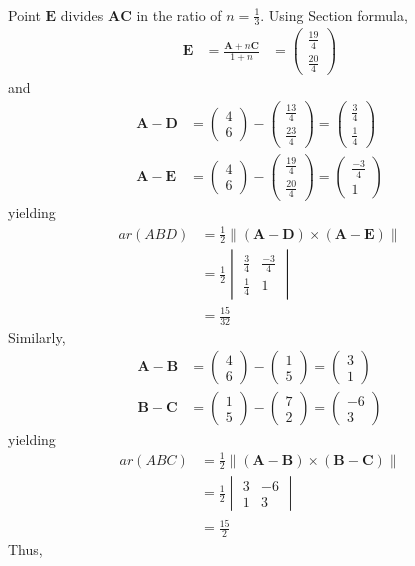 \documentclass[12pt]{article}
\newcommand{\mydet}[1]{\ensuremath{\begin{vmatrix}#1\end{vmatrix}}}
\providecommand{\brak}[1]{\ensuremath{\left(#1\right)}}
\providecommand{\norm}[1]{\left\lVert#1\right\rVert}
\newcommand{\myvec}[1]{\ensuremath{\begin{pmatrix}#1\end{pmatrix}}}
\let\vec\mathbf
\begin{document}
\begin{enumerate}
\begin{align}
\end{align}
Point $\vec{E}$ divides $\vec{A}\vec{C}$ in the ratio of $n = \frac{1}{3}$.
Using Section formula,
\fi
\begin{align}
\vec{E} &=\frac{\vec{A}+n\vec{C}}{1+n}\label{eq:chapters/10/7/4/611}
	&=\myvec{\frac{19}{4}\\[2pt] \frac{20}{4}}
\end{align}
and
\begin{align}
	\vec{A}- \vec{D} &= \myvec{4\\6}-\myvec{\frac{13}{4}\\[2pt] \frac{23}{4}}=\myvec{\frac{3}{4}\\[2pt] \frac{1}{4}}\label{eq:chapters/10/7/4/617}\\
	  \vec{A}- \vec{E} &= \myvec{4\\6}-\myvec{\frac{19}{4}\\[2pt] \frac{20}{4}}=\myvec{\frac{-3}{4}\\[2pt]1}\label{eq:chapters/10/7/4/618}
\end{align}
yielding
\begin{align}
	ar(ABD) &=\frac{1}{2} \norm{\brak{\vec{A}-\vec{D}}  \times 
   \brak{\vec{A}- \vec{E}}} \label{eq:chapters/10/7/4/616} \\
	&=\frac{1}{2}\mydet{\frac{3}{4} & \frac{-3}{4}\\[2pt] \frac{1}{4} & 1}  
	\\
	&=	\frac{15}{32}
\end{align}
Similarly,
\begin{align}
	\vec{A}- \vec{B} &= \myvec{4\\6}-\myvec{1\\5}=\myvec{3\\1}\label{eq:chapters/10/7/4/621}\\
	  \vec{B}-\vec{C} &= \myvec{1\\5}-\myvec{7\\2}=\myvec{-6\\3}\label{eq:chapters/10/7/4/622}
\end{align}
yielding
  \begin{align}
	  ar(ABC) &=\frac{1}{2} \norm{\brak{\vec{A}-\vec{B}}  \times 
   \brak{\vec{B}- \vec{C}}} \label{eq:chapters/10/7/4/620} \\
	  &=\frac{1}{2}\mydet{3 & -6\\1 & 3}  
	  \\
	&=	\frac{15}{2}
\end{align}
Thus,
\begin{align}

\end{align}
\end{enumerate}
\end{document}
